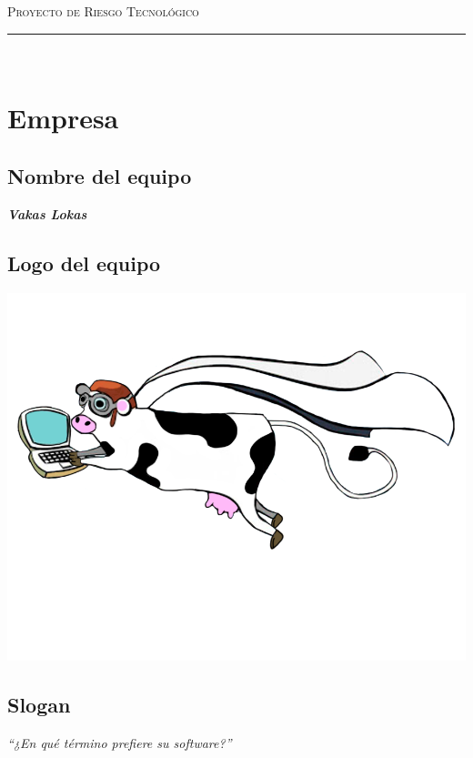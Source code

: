 \documentclass{article}
\begin{document}
\marginsize{2cm}{2cm}{1cm}{2cm} 

\begin{center}
  {\LARGE \scshape Proyecto de Riesgo Tecnológico\\\vspace{10mm} }
  \rule{0.8\textwidth}{.8pt}\\
\end{center}

\section*{Empresa}

\subsection*{Nombre del equipo} \textit{\textbf{Vakas Lokas}}
\subsection*{Logo del equipo}
\begin{center}
  \includegraphics[scale=.2]{../imagenes/logoo.png}
\end{center}
\subsection*{Slogan}
\begin{center}
  \textit{``¿En qué término prefiere su software?''}
                          
\end{center}
\end{document}
